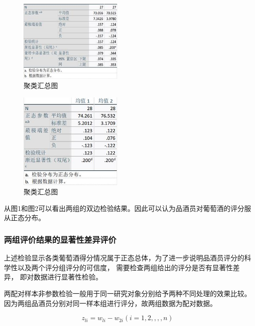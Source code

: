 \documentclass[UTF8]{ctexart}
\begin{document}
\begin{figure}[H]\centering
	\includegraphics[width=0.45\textwidth]{img/1/red_k_S.png} %
	\caption{聚类汇总图} %
	\label{fig:figure 1} %
\end{figure}

\begin{figure}[H]\centering
	\includegraphics[width=0.45\textwidth]{img/1/white_k_S.png} %
	\caption{聚类汇总图} %
	\label{fig:figure 2} %
\end{figure}

从图1\label{figure 1}和图2\label{figure 2}可以看出两组的双边检验结果。因此可以认为品酒员对葡萄酒的评分服从正态分布。

\subsubsection{两组评价结果的显著性差异评价}
上述检验显示各类葡萄酒得分情况属于正态总体，为了进一步说明品酒员评分的科学性以及两个评分组评分的可信度， 需要检查两组给出的评分是否有显著性差异， 即对数据进行显著性检验。

两配对样本非参数检验一般用于同一研究对象分别给予两种不同处理的效果比较。因为两组品酒员分别对同一样本组进行评分，故两组数据为配对数据。

\begin{equation}
	z_{li} = w_{li}-w_{2i}(i=1,2,,,,n)
\end{equation}
\end{document}
